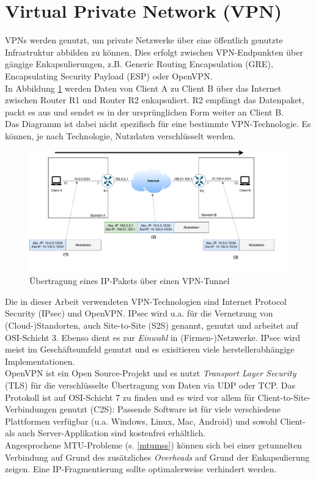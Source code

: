 \section{Virtual Private Network (VPN)}\label{vpn}
VPNs werden genutzt, um private Netzwerke über eine öffentlich genutzte Infrastruktur abbilden zu können. Dies erfolgt zwischen VPN-Endpunkten über gängige Enkapsulierungen, z.B. Generic Routing Encapsulation (GRE), Encapsulating Security Payload (ESP) oder OpenVPN.\\
In Abbildung \ref{grafik: vpn-example} werden Daten von Client A zu Client B über das Internet zwischen Router R1 und Router R2 enkapsuliert. R2 empfängt das Datenpaket, packt es aus und sendet es in der ursprünglichen Form weiter an Client B.\\
Das Diagramm ist dabei nicht spezifisch für eine bestimmte VPN-Technologie. Es können, je nach Technologie, Nutzdaten verschlüsselt werden. 
\begin{figure}[h]
  \centering
  \includegraphics[scale=0.65]{Figures/vpn-example.pdf}
  \caption{Übertragung eines IP-Pakets über einen VPN-Tunnel}
  \label{grafik: vpn-example}
\end{figure}\FloatBarrier

Die in dieser Arbeit verwendeten VPN-Technologien sind Internet Protocol Security (IPsec) und OpenVPN. IPsec wird u.a. für die Vernetzung von (Cloud-)Standorten, auch Site-to-Site (S2S) genannt, genutzt und arbeitet auf OSI-Schicht 3. Ebenso dient es zur \textit{Einwahl} in (Firmen-)Netzwerke. IPsec wird meist im Geschäftsumfeld genutzt und es exisitieren viele herstellerabhängige Implementationen.\\
OpenVPN ist ein Open Source-Projekt und es nutzt \textit{Transport Layer Security} (TLS) für die verschlüsselte Übertragung von Daten via UDP oder TCP. Das Protokoll ist auf OSI-Schicht 7 zu finden und es wird vor allem für Client-to-Site-Verbindungen genutzt (C2S): Passende Software ist für viele verschiedene Plattformen verfügbar (u.a. Windows, Linux, Mac, Android) und sowohl Client- als auch Server-Applikation sind kostenfrei erhältlich.\\
Angesprochene MTU-Probleme (s. \ref{mtumss}) können sich bei einer getunnelten Verbindung auf Grund des zusätzliches \textit{Overheads} auf Grund der Enkapsulierung zeigen. Eine IP-Fragmentierung sollte optimalerweise verhindert werden.

